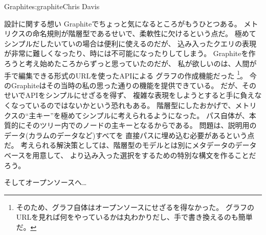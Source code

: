 \begin{aosachapter}{Graphite}{s:graphite}{Chris Davis}
\begin{aosasect1}{設計に関する想い}
Graphiteでちょっと気になるところがもうひとつある。
メトリクスの命名規則が階層型であるせいで、柔軟性に欠けるという点だ。
極めてシンプルだしたいていの場合は便利に使えるのだが、
込み入ったクエリの表現が非常に難しくなったり、時には不可能になったりしてしまう。
Graphiteを作ろうと考え始めたころからずっと思っていたのだが、
私が欲しいのは、人間が手で編集できる形式のURLを使ったAPIによる
グラフの作成機能だった
\footnote{そのため、グラフ自体はオープンソースにせざるを得なかった。
グラフのURLを見れば何をやっているかは丸わかりだし、手で書き換えるのも簡単だ。}。
今のGraphiteはその当時の私の思った通りの機能を提供できている。
だが、そのせいでAPIをシンプルにせざるを得ず、
複雑な表現をしようとすると手に負えなくなっているのではないかという恐れもある。
階層型にしたおかげで、メトリクスの``主キー''を極めてシンプルに考えられるようになった。
パス自体が、本質的にそのツリー内でのノードの主キーとなるからである。
問題は、説明用のデータ(カラムのデータなど)すべてを
直接パスに埋め込む必要があるという点だ。
考えられる解決策としては、階層型のモデルとは別にメタデータのデータベースを用意して、
より込み入った選択をするための特別な構文を作ることだろう。

\end{aosasect1}

\begin{aosasect1}{そしてオープンソースへ…}


\end{aosasect1}
\end{aosachapter}
